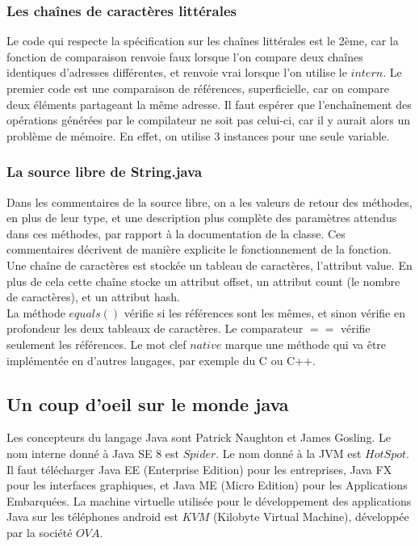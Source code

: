 \documentclass[a4paper,11pts]{article}
\begin{document}
\subsubsection{Les chaînes de caractères littérales}
\indent Le code qui respecte la spécification sur les chaînes littérales est le 2ème, car la fonction de comparaison renvoie faux lorsque l'on compare deux chaînes identiques d'adresses différentes, et renvoie vrai lorsque l'on utilise le $intern$. Le premier code est une comparaison de références, superficielle, car on compare deux éléments partageant la même adresse. Il faut espérer que l'enchaînement des opérations générées par le compilateur ne soit pas celui-ci, car il y aurait alors un problème de mémoire. En effet, on utilise 3 instances pour une seule variable.

\subsubsection{La source libre de String.java}
\indent Dans les commentaires de la source libre, on a les valeurs de retour des méthodes, en plus de leur type, et une description plus complète des paramètres attendus dans ces méthodes, par rapport à la documentation de la classe. Ces commentaires décrivent de manière explicite le fonctionnement de la fonction. Une chaîne de caractères est stockée un tableau de caractères, l'attribut value. En plus de cela cette chaîne stocke un attribut offset, un attribut count (le nombre de caractères), et un attribut hash.
\\
\indent La méthode $equals()$ vérifie si les références sont les mêmes, et sinon vérifie en profondeur les deux tableaux de caractères. Le comparateur $==$ vérifie seulement les références. Le mot clef $native$ marque une méthode qui va être implémentée en d'autres langages, par exemple du C ou C++.

\subsection{Un coup d'oeil sur le monde java}
\indent Les concepteurs du langage Java sont Patrick Naughton et James Gosling. Le nom interne donné à Java SE 8 est $Spider$. Le nom donné à la JVM est $HotSpot$. Il faut télécharger Java EE (Enterprise Edition) pour les entreprises, Java FX pour les interfaces graphiques, et Java ME (Micro Edition) pour les Applications Embarquées. La machine virtuelle utilisée pour le développement des applications Java sur les téléphones android est $KVM$ (Kilobyte Virtual Machine), développée par la société $OVA$.
\end{document}
